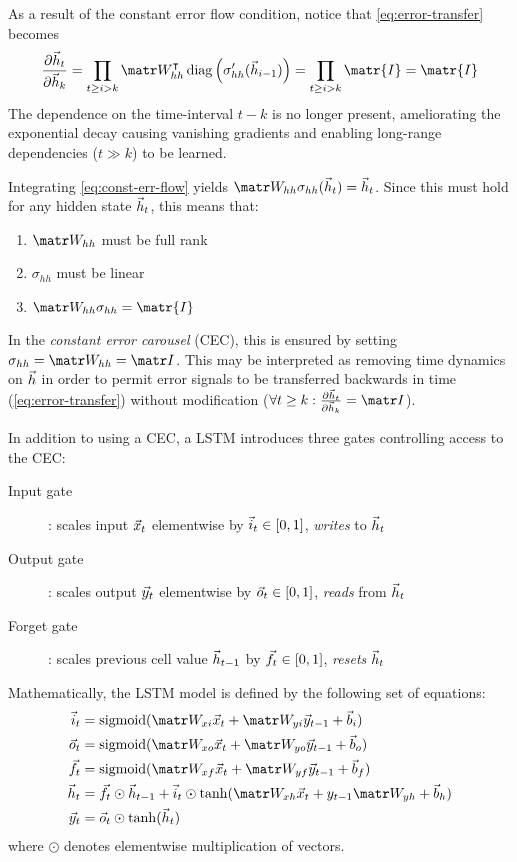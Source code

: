 As a result of the constant error flow condition, notice that \vref{eq:error-transfer}
becomes
\begin{equation}
  \frac{\pd \h_t}{\pd \h_k}
  = \prod_{t \geq i > k} \W_{hh}^\tp \diag \left( \sigma_{hh}'( \h_{i-1} ) \right)
  = \prod_{t \geq i > k} \matr{I}
  = \matr{I}
\end{equation}
The dependence on the time-interval $t-k$ is no longer present, ameliorating
the exponential decay causing vanishing gradients and enabling long-range
dependencies (\ie $t \gg k$) to be learned.

Integrating \cref{eq:const-err-flow} yields $\W_{hh} \sigma_{hh}(\h_{t}) = \h_{t}$.
Since this must hold for any hidden state $\vec{h}_{t}$, this means that:
\begin{enumerate}
    \item $\W_{hh}$ must be full rank
    \item $\sigma_{hh}$ must be linear
    \item $\W_{hh} \sigma_{hh} = \matr{I}$
\end{enumerate}

In the \emph{constant error carousel} (CEC), this is ensured by setting
$\sigma_{hh} = \W_{hh} = \I$. This may be interpreted as removing time dynamics
on $\vec{h}$ in order to permit error signals to be transferred backwards in time
(\cref{eq:error-transfer}) without modification (\ie $\forall t \geq k: \frac{\pd
\h_t}{\pd \h_k} = \I$).

In addition to using a CEC, a LSTM introduces three gates controlling access to the CEC:
\begin{description}
  \item[Input gate]: scales input $\vec{x}_t$ elementwise by $\vec{i}_t \in [0,1]$, \emph{writes} to $\vec{h}_t$
  \item[Output gate]: scales output $\vec{y}_t$ elementwise by $\vec{o}_t \in [0,1]$, \emph{reads} from $\vec{h}_t$
  \item[Forget gate]: scales previous cell value $\vec{h}_{t-1}$ by $\vec{f}_t \in [0,1]$, \emph{resets} $\vec{h}_t$
\end{description}

Mathematically, the LSTM model is defined by the following set of equations:
\begin{align}
    \i_t &= \sigmoid(\W_{xi} \x_t + \W_{yi} \y_{t-1} + \b_i) \\
    \o_t &= \sigmoid(\W_{xo} \x_t + \W_{yo} \y_{t-1} + \b_o) \\
    \f_t &= \sigmoid(\W_{xf} \x_t + \W_{yf} \y_{t-1} + \b_f) \\
    \h_t &= \f_t \odot \h_{t-1} + \i_t \odot \tanh(\W_{xh}\x_t + y_{t-1} \W_{yh} + \b_h) \\
    \y_t &= \o_t \odot \tanh(\h_t)
\end{align}
where $\odot$ denotes elementwise multiplication of vectors.

